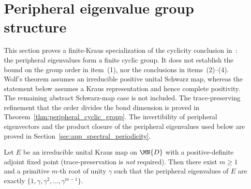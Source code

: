 \section{Peripheral eigenvalue group structure}

This section proves a finite-Kraus specialization of the cyclicity conclusion
in~\cite[Theorem~6.6(1)]{Wolf2012Quantum}: the peripheral eigenvalues form a
finite cyclic group. It does not establish the bound on the group order in
item~(1), nor the conclusions in items~(2)--(4). Wolf's theorem assumes an
irreducible positive unital Schwarz map, whereas the statement below assumes a
Kraus representation and hence complete positivity. The remaining abstract
Schwarz-map case is not included. The trace-preserving refinement that the order divides the bond
dimension is proved in Theorem~\ref{thm:peripheral_cyclic_group}. The
invertibility of peripheral eigenvectors and the product closure of the
peripheral eigenvalues used below are proved in
Section~\ref{sec:app_spectral_periodicity}.

\begin{theorem}%
    \label{thm:peripheral_cyclic_structure}
    \leanok
    Let $E$ be an irreducible unital Kraus map on $\MN{D}$ with a
    positive-definite adjoint fixed point (trace-preservation is \emph{not}
    required).
    Then there exist $m \ge 1$ and a primitive $m$-th root of unity
    $\gamma$ such that the peripheral eigenvalues of $E$ are exactly
    $\{1,\gamma,\gamma^2,\ldots,\gamma^{m-1}\}$.
\end{theorem}

